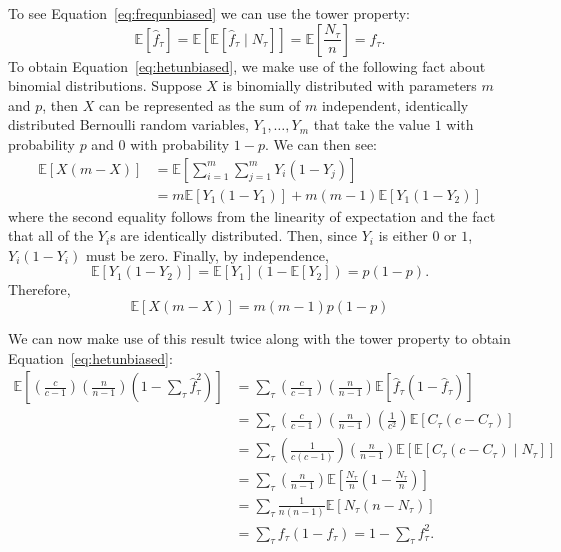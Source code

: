 \documentclass[a4paper,fontsize=9pt,DIV=14]{scrartcl}
\newcommand{\samplesize}{n}
\newcommand{\coverage}{c}
\newcommand{\empfreq}{\widehat{f}}
\begin{document}
To see Equation~\ref{eq:frequnbiased} we can use the tower property:
\[
\mathbb{E}\left[\empfreq_\tau\right] = \mathbb{E}\left[\mathbb{E}\left[\empfreq_\tau \mid N_\tau \right]\right] = \mathbb{E}\left[\frac{N_\tau}{n}\right] = f_\tau.
\]
To obtain Equation~\ref{eq:hetunbiased}, we make use of the following fact about binomial distributions.  Suppose $X$ is binomially distributed with parameters $m$ and $p$, then $X$ can be represented as the sum of $m$ independent, identically distributed Bernoulli random variables, $Y_1,\ldots,Y_m$ that take the value $1$ with probability $p$ and $0$ with probability $1-p$.  We can then see:
\begin{align*}
\mathbb{E}\left[X(m-X)\right] &= \mathbb{E}\left[\sum_{i=1}^m\sum_{j=1}^mY_i(1-Y_j)\right]\\
&= m\mathbb{E}\left[Y_1(1-Y_1)\right] + m(m-1)\mathbb{E}\left[Y_1(1-Y_2)\right]
\end{align*}
where the second equality follows from the linearity of expectation and the fact that all of the $Y_i$s are identically distributed.  Then, since $Y_i$ is either $0$ or $1$, $Y_i(1-Y_i)$ must be zero.  Finally, by independence,
\[
\mathbb{E}\left[Y_1(1-Y_2)\right] = \mathbb{E}\left[Y_1\right]\left(1-\mathbb{E}\left[Y_2\right]\right) = p(1-p).
\]
Therefore,
\[
\mathbb{E}\left[X(m-X)\right]  = m(m-1)p(1-p)
\]

We can now make use of this result twice along with the tower property to obtain Equation~\ref{eq:hetunbiased}:
\begin{align*}
\mathbb{E}\left[\left(\frac{\coverage}{\coverage-1}\right)\left(\frac{\samplesize}{\samplesize-1}\right)\left(1-\sum_\tau\empfreq_\tau^2\right)\right] &= \sum_\tau\left(\frac{\coverage}{\coverage-1}\right)\left(\frac{\samplesize}{\samplesize-1}\right) \mathbb{E}\left[\empfreq_\tau(1-\empfreq_\tau)\right]\\
&=  \sum_\tau\left(\frac{\coverage}{\coverage-1}\right)\left(\frac{\samplesize}{\samplesize-1}\right) \left(\frac{1}{\coverage^2}\right) \mathbb{E}\left[C_\tau\left(c-C_\tau\right)\right]\\
&= \sum_\tau\left(\frac{1}{\coverage(\coverage-1)}\right)\left(\frac{\samplesize}{\samplesize-1}\right) \mathbb{E}\left[\mathbb{E}\left[C_\tau\left(c-C_\tau\right) \mid N_\tau\right]\right]\\
&= \sum_\tau\left(\frac{\samplesize}{\samplesize-1}\right) \mathbb{E}\left[\frac{N_\tau}{\samplesize}\left(1-\frac{N_\tau}{\samplesize}\right)\right]\\
&= \sum_\tau\frac{1}{\samplesize(\samplesize-1)}\mathbb{E}\left[N_\tau\left(\samplesize - N_\tau\right)\right]\\
&= \sum_\tau f_\tau(1-f_\tau) = 1 - \sum_\tau f_\tau^2.
\end{align*}
\end{document}
